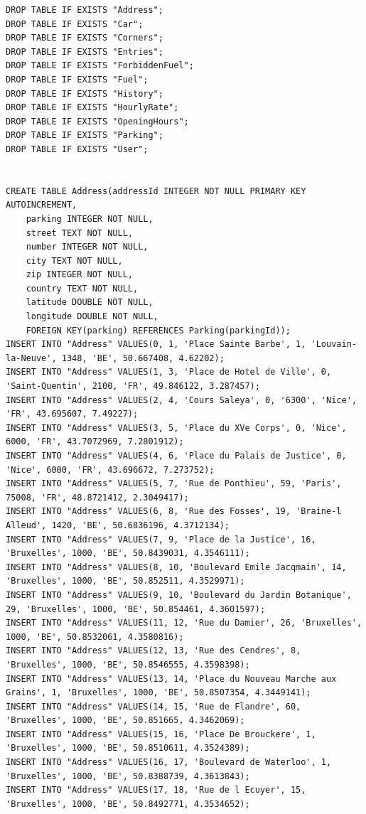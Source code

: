 \documentclass[a4paper,11pt]{article}
\begin{document}
\begin{lstlisting}
DROP TABLE IF EXISTS "Address";
DROP TABLE IF EXISTS "Car";
DROP TABLE IF EXISTS "Corners";
DROP TABLE IF EXISTS "Entries";
DROP TABLE IF EXISTS "ForbiddenFuel";
DROP TABLE IF EXISTS "Fuel";
DROP TABLE IF EXISTS "History";
DROP TABLE IF EXISTS "HourlyRate";
DROP TABLE IF EXISTS "OpeningHours";
DROP TABLE IF EXISTS "Parking";
DROP TABLE IF EXISTS "User";


CREATE TABLE Address(addressId INTEGER NOT NULL PRIMARY KEY AUTOINCREMENT, 
	parking INTEGER NOT NULL, 
	street TEXT NOT NULL, 
	number INTEGER NOT NULL, 
	city TEXT NOT NULL, 
	zip INTEGER NOT NULL, 
	country TEXT NOT NULL, 
	latitude DOUBLE NOT NULL, 
	longitude DOUBLE NOT NULL, 
	FOREIGN KEY(parking) REFERENCES Parking(parkingId));
INSERT INTO "Address" VALUES(0, 1, 'Place Sainte Barbe', 1, 'Louvain-la-Neuve', 1348, 'BE', 50.667408, 4.62202);
INSERT INTO "Address" VALUES(1, 3, 'Place de Hotel de Ville', 0, 'Saint-Quentin', 2100, 'FR', 49.846122, 3.287457);
INSERT INTO "Address" VALUES(2, 4, 'Cours Saleya', 0, '6300', 'Nice', 'FR', 43.695607, 7.49227);
INSERT INTO "Address" VALUES(3, 5, 'Place du XVe Corps', 0, 'Nice', 6000, 'FR', 43.7072969, 7.2801912);
INSERT INTO "Address" VALUES(4, 6, 'Place du Palais de Justice', 0, 'Nice', 6000, 'FR', 43.696672, 7.273752);
INSERT INTO "Address" VALUES(5, 7, 'Rue de Ponthieu', 59, 'Paris', 75008, 'FR', 48.8721412, 2.3049417);
INSERT INTO "Address" VALUES(6, 8, 'Rue des Fosses', 19, 'Braine-l Alleud', 1420, 'BE', 50.6836196, 4.3712134);
INSERT INTO "Address" VALUES(7, 9, 'Place de la Justice', 16, 'Bruxelles', 1000, 'BE', 50.8439031, 4.3546111);
INSERT INTO "Address" VALUES(8, 10, 'Boulevard Emile Jacqmain', 14, 'Bruxelles', 1000, 'BE', 50.852511, 4.3529971);
INSERT INTO "Address" VALUES(9, 10, 'Boulevard du Jardin Botanique', 29, 'Bruxelles', 1000, 'BE', 50.854461, 4.3601597);
INSERT INTO "Address" VALUES(11, 12, 'Rue du Damier', 26, 'Bruxelles', 1000, 'BE', 50.8532061, 4.3580816);
INSERT INTO "Address" VALUES(12, 13, 'Rue des Cendres', 8, 'Bruxelles', 1000, 'BE', 50.8546555, 4.3598398);
INSERT INTO "Address" VALUES(13, 14, 'Place du Nouveau Marche aux Grains', 1, 'Bruxelles', 1000, 'BE', 50.8507354, 4.3449141);
INSERT INTO "Address" VALUES(14, 15, 'Rue de Flandre', 60, 'Bruxelles', 1000, 'BE', 50.851665, 4.3462069);
INSERT INTO "Address" VALUES(15, 16, 'Place De Brouckere', 1, 'Bruxelles', 1000, 'BE', 50.8510611, 4.3524389);
INSERT INTO "Address" VALUES(16, 17, 'Boulevard de Waterloo', 1, 'Bruxelles', 1000, 'BE', 50.8388739, 4.3613843);
INSERT INTO "Address" VALUES(17, 18, 'Rue de l Ecuyer', 15, 'Bruxelles', 1000, 'BE', 50.8492771, 4.3534652);



\end{lstlisting}
\end{document}
